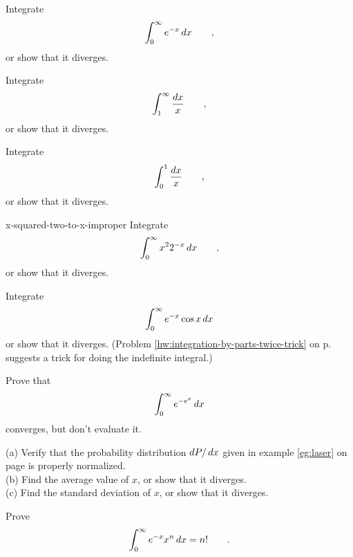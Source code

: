 \begin{hwsection}

\begin{hw}
Integrate
\begin{equation*}
  \int_0^\infty e^{-x} \mathop{d\!} x \qquad ,
\end{equation*}
or show that it diverges.
\end{hw}

\begin{hw}
Integrate
\begin{equation*}
  \int_1^\infty \frac{\mathop{d\!} x}{x} \qquad ,
\end{equation*}
or show that it diverges.
\end{hw}

\begin{hw}
Integrate
\begin{equation*}
  \int_0^1 \frac{\mathop{d\!} x}{x} \qquad ,
\end{equation*}
or show that it diverges.
\end{hw}

\begin{hwwithsoln}{x-squared-two-to-x-improper}
Integrate
\begin{equation*}
  \int_0^\infty x^2 2^{-x} \mathop{d\!} x \qquad ,
\end{equation*}
or show that it diverges.
\end{hwwithsoln}

\begin{hw}
Integrate
\begin{equation*}
  \int_0^\infty e^{-x}\cos x \mathop{d\!} x
\end{equation*}
or show that it diverges. (Problem \ref{hw:integration-by-parts-twice-trick} on p.~\pageref{hw:integration-by-parts-twice-trick} suggests
a trick for doing the indefinite integral.)
\end{hw}

\begin{hw}
Prove that
\begin{equation*}
  \int_0^\infty e^{-e^x} \mathop{d\!} x
\end{equation*}
converges, but don't evaluate it.
\end{hw}

\begin{hw}\label{hw:laser}
(a) Verify that the probability distribution $\mathop{d\!} P/\mathop{d\!} x$ given in example \ref{eg:laser} on page \pageref{eg:laser}
is properly normalized.\\
(b) Find the average value of $x$, or show that it diverges.\\
(c) Find the standard deviation of $x$, or show that it diverges.
\end{hw}

\begin{hw}[2]
Prove
\begin{equation*}
  \int_0^\infty e^{-x}x^n\mathop{d\!} x = n! \qquad .
\end{equation*}
\end{hw}

\end{hwsection}
